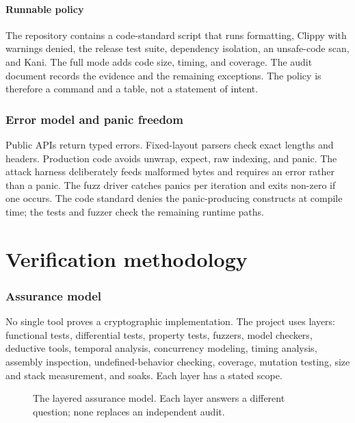 \documentclass[11pt,a4paper]{article}
\theoremstyle{remark}
\begin{document}
\subsection{Runnable policy}

The repository contains a code-standard script that runs formatting, Clippy with
warnings denied, the release test suite, dependency isolation, an unsafe-code
scan, and Kani. The full mode adds code size, timing, and coverage. The audit
document records the evidence and the remaining exceptions. The policy is
therefore a command and a table, not a statement of intent.

\section{Error model and panic freedom}

Public APIs return typed errors. Fixed-layout parsers check exact lengths and
headers. Production code avoids unwrap, expect, raw indexing, and panic. The
attack harness deliberately feeds malformed bytes and requires an error rather
than a panic. The fuzz driver catches panics per iteration and exits non-zero if
one occurs. The code standard denies the panic-producing constructs at compile
time; the tests and fuzzer check the remaining runtime paths.

\part{Verification methodology}

\section{Assurance model}

No single tool proves a cryptographic implementation. The project uses layers:
functional tests, differential tests, property tests, fuzzers, model checkers,
deductive tools, temporal analysis, concurrency modeling, timing analysis,
assembly inspection, undefined-behavior checking, coverage, mutation testing,
size and stack measurement, and soaks. Each layer has a stated scope.

\begin{figure}[ht]
\centering
{}
\caption{The layered assurance model. Each layer answers a different question;
none replaces an independent audit.}
\label{fig:assurance}
\end{figure}
\end{document}
